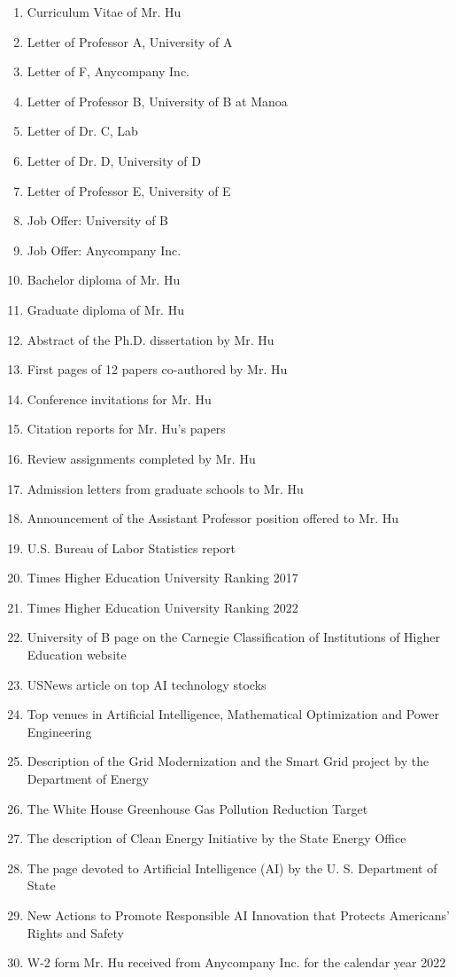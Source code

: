 \documentclass{article}
\begin{document}
\begin{enumerate}[label={Exhibit \arabic*:}]
    \item Curriculum Vitae of Mr. Hu 
    \item Letter of Professor A, University of A 
    \item Letter of F, Anycompany Inc. 
    \item Letter of Professor B, University of B at Manoa 
    \item Letter of Dr. C, Lab 
    \item Letter of Dr. D, University of D 
    \item Letter of Professor E, University of E
    \item Job Offer: University of B
    \item Job Offer: Anycompany Inc.
    \item Bachelor diploma of Mr. Hu 
    \item Graduate diploma of Mr. Hu 
    \item Abstract of the Ph.D. dissertation by Mr. Hu 
    \item First pages of 12 papers co-authored by Mr. Hu 
    \item Conference invitations for Mr. Hu 
    \item Citation reports for Mr. Hu’s papers 
    \item Review assignments completed by Mr. Hu 
    \item Admission letters from graduate schools to Mr. Hu 
    \item Announcement of the Assistant Professor position offered to Mr. Hu 
    \item U.S. Bureau of Labor Statistics report 
    \item Times Higher Education University Ranking 2017 
    \item Times Higher Education University Ranking 2022 
    \item University of B page on the Carnegie Classification of Institutions of Higher Education website 
    \item USNews article on top AI technology stocks 
    \item Top venues in Artificial Intelligence, Mathematical Optimization and Power Engineering 
    \item Description of the Grid Modernization and the Smart Grid project by the Department of Energy 
    \item The White House Greenhouse Gas Pollution Reduction Target 
    \item The description of Clean Energy Initiative by the State Energy Office 
    \item The page devoted to Artificial Intelligence (AI) by the U. S. Department of State
    \item New Actions to Promote Responsible AI Innovation that Protects Americans’ Rights and Safety 
    \item W-2 form Mr. Hu received from Anycompany Inc. for the calendar year 2022
\end{enumerate}
\end{document}

